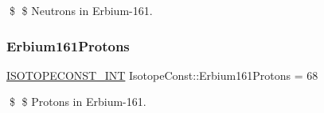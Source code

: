 \$ \$ Neutrons in Erbium-\/161. \mbox{\label{group___isotope_const-_erbium-_er161_ga18b55614d4e9894d2484a3353013e34c}} 
\subsubsection{\texorpdfstring{Erbium161\+Protons}{Erbium161Protons}}
{\footnotesize\ttfamily \mbox{\hyperlink{group___isotope_const-_macros_ga5f18360b3e99483a35c32d789e62621c}{I\+S\+O\+T\+O\+P\+E\+C\+O\+N\+S\+T\+\_\+\+I\+NT}} Isotope\+Const\+::\+Erbium161\+Protons = 68}

\$ \$ Protons in Erbium-\/161. 